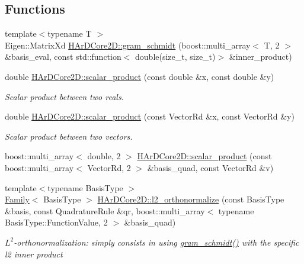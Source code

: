 \subsection*{Functions}
\begin{DoxyCompactItemize}
\item 
{\footnotesize template$<$typename T $>$ }\\Eigen\+::\+Matrix\+Xd \hyperlink{group__Basis_ga9ea7809705d01c7cf6bca57a457a44a4}{H\+Ar\+D\+Core2\+D\+::gram\+\_\+schmidt} (boost\+::multi\+\_\+array$<$ T, 2 $>$ \&basis\+\_\+eval, const std\+::function$<$ double(size\+\_\+t, size\+\_\+t)$>$ \&inner\+\_\+product)
\item 
\mbox{\label{group__Basis_ga5363b354f8dce20ca199459fe4074fda}} 
double \hyperlink{group__Basis_ga5363b354f8dce20ca199459fe4074fda}{H\+Ar\+D\+Core2\+D\+::scalar\+\_\+product} (const double \&x, const double \&y)
\begin{DoxyCompactList}\small\item\em Scalar product between two reals. \end{DoxyCompactList}\item 
\mbox{\label{group__Basis_gad1566133b908e08f82d4598114bf10f3}} 
double \hyperlink{group__Basis_gad1566133b908e08f82d4598114bf10f3}{H\+Ar\+D\+Core2\+D\+::scalar\+\_\+product} (const Vector\+Rd \&x, const Vector\+Rd \&y)
\begin{DoxyCompactList}\small\item\em Scalar product between two vectors. \end{DoxyCompactList}\item 
boost\+::multi\+\_\+array$<$ double, 2 $>$ \hyperlink{group__Basis_ga5c6454782d8290f926940267271951bf}{H\+Ar\+D\+Core2\+D\+::scalar\+\_\+product} (const boost\+::multi\+\_\+array$<$ Vector\+Rd, 2 $>$ \&basis\+\_\+quad, const Vector\+Rd \&v)
\item 
{\footnotesize template$<$typename Basis\+Type $>$ }\\\hyperlink{classHArDCore2D_1_1Family}{Family}$<$ Basis\+Type $>$ \hyperlink{group__Basis_ga3a5604879e905ecb08cbf4dda5d9a33c}{H\+Ar\+D\+Core2\+D\+::l2\+\_\+orthonormalize} (const Basis\+Type \&basis, const Quadrature\+Rule \&qr, boost\+::multi\+\_\+array$<$ typename Basis\+Type\+::\+Function\+Value, 2 $>$ \&basis\+\_\+quad)
\begin{DoxyCompactList}\small\item\em $L^2$-\/orthonormalization\+: simply consists in using \hyperlink{group__Basis_ga9ea7809705d01c7cf6bca57a457a44a4}{gram\+\_\+schmidt()} with the specific l2 inner product \end{DoxyCompactList}\item 

\end{DoxyCompactItemize}
